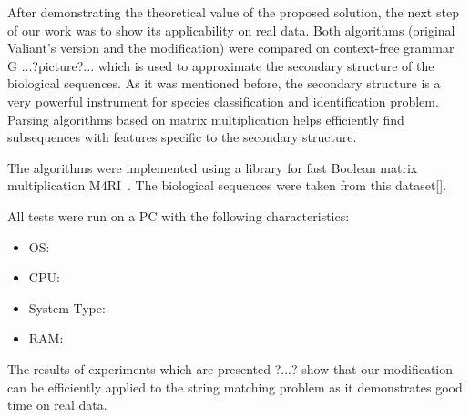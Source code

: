 After demonstrating the theoretical value of the proposed solution, the next step of our work was to show its applicability on real data. Both algorithms (original Valiant's version and the modification) were compared on context-free grammar G  ...?picture?...  which is used to approximate the secondary structure of the biological sequences. As it was mentioned before, the secondary structure is a very powerful instrument for species classification and identification problem. Parsing algorithms based on matrix multiplication helps efficiently find subsequences with features specific to the secondary structure.

The algorithms were implemented using a library for fast Boolean matrix multiplication M4RI~\cite{m4ri}. The biological sequences were taken from this dataset[].

All tests were run on a PC with the following characteristics:
\begin{itemize}
\item OS:
\item CPU:
\item System Type:
\item RAM:
\end{itemize}

The results of experiments which are presented ?...? show that our modification can be efficiently applied to the string matching problem as it demonstrates good time on real data.
